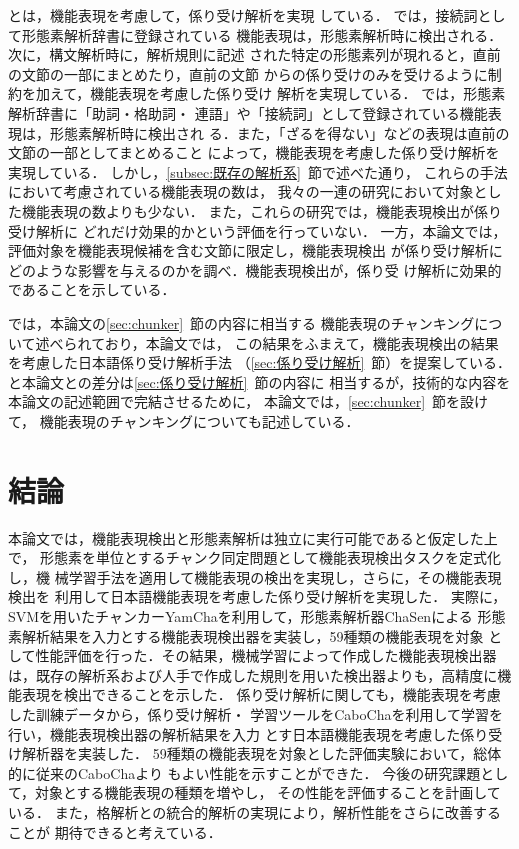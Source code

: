 \documentclass[japanese]{jnlp_1.3e}
\begin{document}
\cite{knp-2.0}と\cite{TKudo02aj}は，機能表現を考慮して，係り受け解析を実現
している．
\cite{knp-2.0}では，接続詞として形態素解析辞書に登録されている
機能表現は，形態素解析時に検出される．次に，構文解析時に，解析規則に記述
された特定の形態素列が現れると，直前の文節の一部にまとめたり，直前の文節
からの係り受けのみを受けるように制約を加えて，機能表現を考慮した係り受け
解析を実現している．
\cite{TKudo02aj}では，形態素解析辞書に「助詞・格助詞・
連語」や「接続詞」として登録されている機能表現は，形態素解析時に検出され
る．また，「ざるを得ない」などの表現は直前の文節の一部としてまとめること
によって，機能表現を考慮した係り受け解析を実現している．
しかし，\ref{subsec:既存の解析系}~節で述べた通り，
これらの手法において考慮されている機能表現の数は，
我々の一連の研究において対象とした機能表現の数よりも少ない．
また，これらの研究では，機能表現検出が係り受け解析に
どれだけ効果的かという評価を行っていない．
一方，本論文では，評価対象を機能表現候補を含む文節に限定し，機能表現検出
が係り受け解析にどのような影響を与えるのかを調べ．機能表現検出が，係り受
け解析に効果的であることを示している．

\cite{Tsuchiya07aj}では，本論文の\ref{sec:chunker}~節の内容に相当する
機能表現のチャンキングについて述べられており，本論文では，
この結果をふまえて，機能表現検出の結果を考慮した日本語係り受け解析手法
（\ref{sec:係り受け解析}~節）を提案している．
\cite{Tsuchiya07aj}と本論文との差分は\ref{sec:係り受け解析}~節の内容に
相当するが，技術的な内容を本論文の記述範囲で完結させるために，
本論文では，\ref{sec:chunker}~節を設けて，
機能表現のチャンキングについても記述している．


\section{結論}
\label{sec:結論}

本論文では，機能表現検出と形態素解析は独立に実行可能であると仮定した上で，
形態素を単位とするチャンク同定問題として機能表現検出タスクを定式化し，機
械学習手法を適用して機能表現の検出を実現し，さらに，その機能表現検出を
利用して日本語機能表現を考慮した係り受け解析を実現した．
実際に，SVMを用いたチャンカーYamChaを利用して，形態素解析器ChaSenによる
形態素解析結果を入力とする機能表現検出器を実装し，59種類の機能表現を対象
として性能評価を行った．その結果，機械学習によって作成した機能表現検出器
は，既存の解析系および人手で作成した規則を用いた検出器よりも，高精度に機
能表現を検出できることを示した．
係り受け解析に関しても，機能表現を考慮した訓練データから，係り受け解析・
学習ツールをCaboChaを利用して学習を行い，機能表現検出器の解析結果を入力
とす日本語機能表現を考慮した係り受け解析器を実装した．
59種類の機能表現を対象とした評価実験において，総体的に従来のCaboChaより
もよい性能を示すことができた．
今後の研究課題として，対象とする機能表現の種類を増やし，
その性能を評価することを計画している．
また，格解析との統合的解析の実現により，解析性能をさらに改善することが
期待できると考えている．
\end{document}
